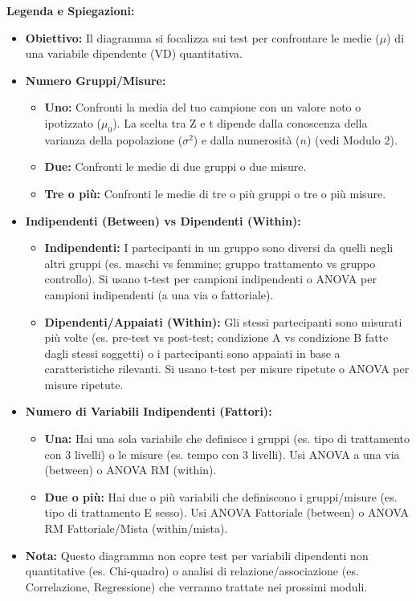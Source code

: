 \documentclass[12pt, a4paper]{article}
\begin{document}
\textbf{Legenda e Spiegazioni:}
\begin{itemize}
    \item \textbf{Obiettivo:} Il diagramma si focalizza sui test per confrontare le medie ($\mu$) di una variabile dipendente (VD) quantitativa.
    \item \textbf{Numero Gruppi/Misure:}
        \begin{itemize}
            \item \textbf{Uno:} Confronti la media del tuo campione con un valore noto o ipotizzato ($\mu_0$). La scelta tra Z e t dipende dalla conoscenza della varianza della popolazione ($\sigma^2$) e dalla numerosità ($n$) (vedi Modulo 2).
            \item \textbf{Due:} Confronti le medie di due gruppi o due misure.
            \item \textbf{Tre o più:} Confronti le medie di tre o più gruppi o tre o più misure.
        \end{itemize}
    \item \textbf{Indipendenti (Between) vs Dipendenti (Within):}
        \begin{itemize}
            \item \textbf{Indipendenti:} I partecipanti in un gruppo sono diversi da quelli negli altri gruppi (es. maschi vs femmine; gruppo trattamento vs gruppo controllo). Si usano t-test per campioni indipendenti o ANOVA per campioni indipendenti (a una via o fattoriale).
            \item \textbf{Dipendenti/Appaiati (Within):} Gli stessi partecipanti sono misurati più volte (es. pre-test vs post-test; condizione A vs condizione B fatte dagli stessi soggetti) o i partecipanti sono appaiati in base a caratteristiche rilevanti. Si usano t-test per misure ripetute o ANOVA per misure ripetute.
        \end{itemize}
    \item \textbf{Numero di Variabili Indipendenti (Fattori):}
        \begin{itemize}
            \item \textbf{Una:} Hai una sola variabile che definisce i gruppi (es. tipo di trattamento con 3 livelli) o le misure (es. tempo con 3 livelli). Usi ANOVA a una via (between) o ANOVA RM (within).
            \item \textbf{Due o più:} Hai due o più variabili che definiscono i gruppi/misure (es. tipo di trattamento E sesso). Usi ANOVA Fattoriale (between) o ANOVA RM Fattoriale/Mista (within/mista).
        \end{itemize}
    \item \textbf{Nota:} Questo diagramma non copre test per variabili dipendenti non quantitative (es. Chi-quadro) o analisi di relazione/associazione (es. Correlazione, Regressione) che verranno trattate nei prossimi moduli.
\end{itemize}
\end{document}
